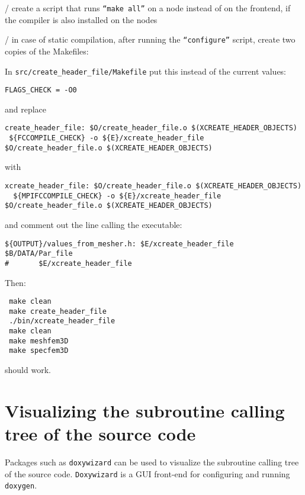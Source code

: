/ create a script that runs \texttt{``make all''} on a node instead of on the frontend, if the compiler is also installed on the nodes \newline

/ in case of static compilation, after running the \texttt{``configure''} script, create two copies of the Makefiles:
\newline
{}
\newline

\noindent
In \texttt{src/create\_header\_file/Makefile} put this instead of the current values:
{\small
\begin{verbatim}
FLAGS_CHECK = -O0
\end{verbatim}
}
\noindent
and replace
{\small
\begin{verbatim}
create_header_file: $O/create_header_file.o $(XCREATE_HEADER_OBJECTS)
 ${FCCOMPILE_CHECK} -o ${E}/xcreate_header_file $O/create_header_file.o $(XCREATE_HEADER_OBJECTS)
\end{verbatim}
}
\noindent
with
{\small
\begin{verbatim}
xcreate_header_file: $O/create_header_file.o $(XCREATE_HEADER_OBJECTS)
  ${MPIFCCOMPILE_CHECK} -o ${E}/xcreate_header_file $O/create_header_file.o $(XCREATE_HEADER_OBJECTS)
\end{verbatim}
}
\noindent
and comment out the line calling the executable:
{\small
\begin{verbatim}
${OUTPUT}/values_from_mesher.h: $E/xcreate_header_file $B/DATA/Par_file
#       $E/xcreate_header_file
\end{verbatim}
}
\noindent
Then:
{\small
\begin{verbatim}
 make clean
 make create_header_file
 ./bin/xcreate_header_file
 make clean
 make meshfem3D
 make specfem3D
\end{verbatim}
}
\noindent
should work.


\section{Visualizing the subroutine calling tree of the source code}

Packages such as \texttt{doxywizard} can be used to visualize the subroutine calling tree of the source code.
\texttt{Doxywizard} is a GUI front-end for configuring and running \texttt{doxygen}.

